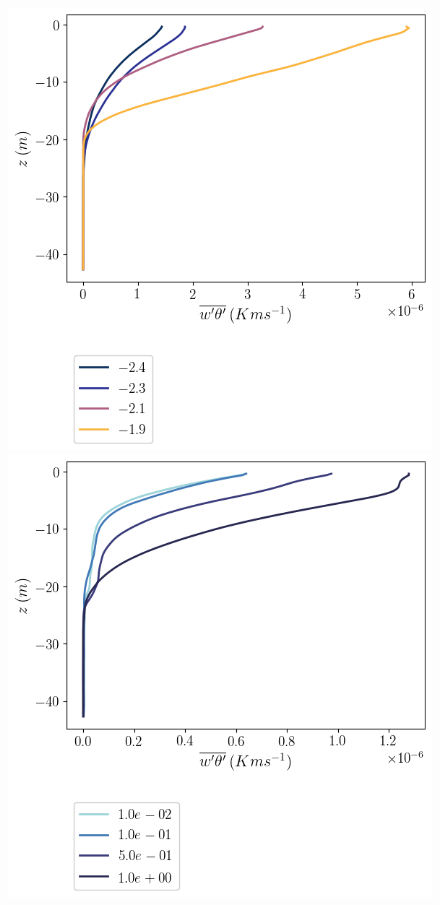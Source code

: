 \begin{figure}
    \centering
    \begin{minipage}{0.5\textwidth}
        \includegraphics[trim={0 4cm 0 0},clip,width=\textwidth]{Figures/heatflux_cmp_dT_44h_tav12_z_profile.png}
    \end{minipage}%
    \begin{minipage}{0.5\textwidth}
        \includegraphics[trim={0 4cm 0 0},clip,width=\textwidth]{Figures/heatflux_cmp_slope_46h_tav12_z_profile.png}

\end{minipage}
\end{figure}
